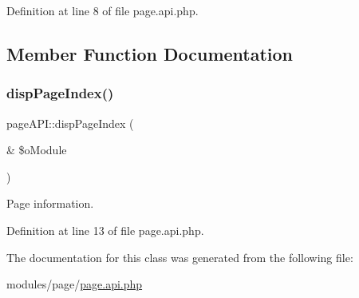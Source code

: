 Definition at line 8 of file page.\+api.\+php.



\subsection{Member Function Documentation}
\mbox{\label{classpageAPI_a75a866f5715bbd74bdd977676027cd20}} 
\subsubsection{\texorpdfstring{disp\+Page\+Index()}{dispPageIndex()}}
{\footnotesize\ttfamily page\+A\+P\+I\+::disp\+Page\+Index (\begin{DoxyParamCaption}\item[{\&}]{\$o\+Module }\end{DoxyParamCaption})}



Page information. 



Definition at line 13 of file page.\+api.\+php.



The documentation for this class was generated from the following file\+:\begin{DoxyCompactItemize}
\item 
modules/page/\hyperlink{page_8api_8php}{page.\+api.\+php}\end{DoxyCompactItemize}
